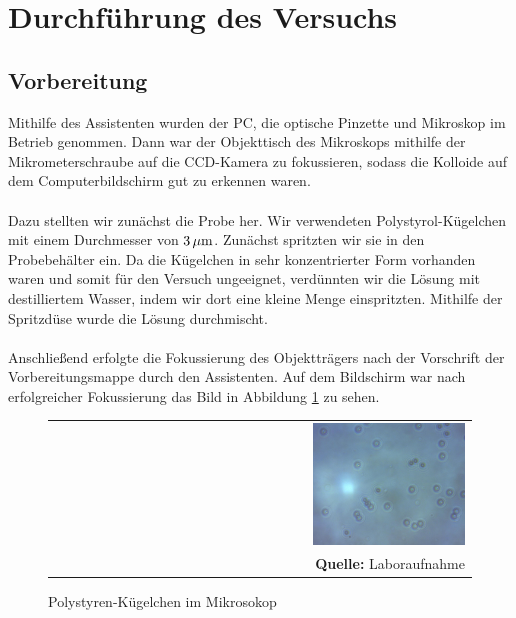 \documentclass[a4paper,titlepage]{scrartcl}
\numberwithin{equation}{section}
\begin{document}
\section{Durchführung des Versuchs}
\subsection{Vorbereitung}
Mithilfe des Assistenten wurden der PC, die optische Pinzette und Mikroskop im Betrieb genommen. Dann war der Objekttisch des Mikroskops mithilfe der Mikrometerschraube auf die CCD-Kamera zu fokussieren, sodass die Kolloide auf dem Computerbildschirm gut zu erkennen waren.\\ \\
Dazu stellten wir zunächst die Probe her. Wir verwendeten Polystyrol-Kügelchen mit einem Durchmesser von $\unit[3]{\mu m}$. Zunächst spritzten wir sie in den Probebehälter ein.
Da die Kügelchen in sehr konzentrierter Form vorhanden waren und somit für den Versuch ungeeignet, verdünnten wir die Lösung mit destilliertem Wasser, indem wir dort eine kleine Menge einspritzten. Mithilfe der Spritzdüse wurde die Lösung durchmischt.\\ \\
Anschließend erfolgte die Fokussierung des Objektträgers nach der Vorschrift der Vorbereitungsmappe durch den Assistenten. Auf dem Bildschirm war nach erfolgreicher Fokussierung das Bild in Abbildung \ref{fig:laboraufnahme1} zu sehen.
\begin{figure}[H]
	\centering
	\begin{tabular}{@{}r@{}}
		\includegraphics[width=0.37\textwidth]{images/aufgabe3-2.jpg}\\
		\footnotesize\sffamily\textbf{Quelle:} Laboraufnahme
	\end{tabular}
	\caption{Polystyren-Kügelchen im Mikrosokop}
    \label{fig:laboraufnahme1}
\end{figure}
\end{document}
